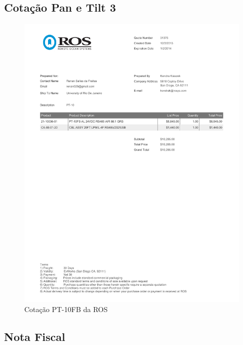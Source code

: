 \subsection{Cotação Pan e Tilt 3 }
\begin{figure}[H]
 \centering
 \includegraphics[width=1\columnwidth]{Pan_Tilt/price_quote_2}
 \caption{Cotação PT-10FB da ROS } 
\end{figure}

\subsection{Nota Fiscal}